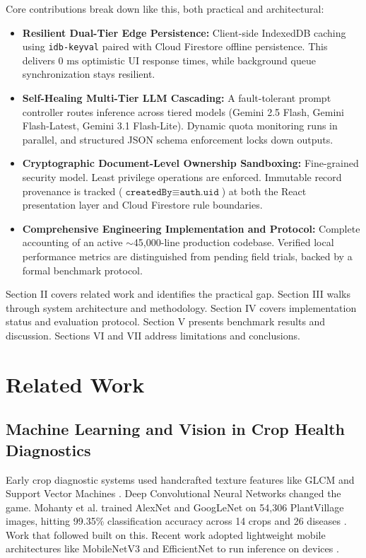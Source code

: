 \documentclass[conference]{IEEEtran}
\begin{document}
Core contributions break down like this, both practical and architectural:
\begin{itemize}
    \item \textbf{Resilient Dual-Tier Edge Persistence:} Client-side IndexedDB caching using \texttt{idb-keyval} paired with Cloud Firestore offline persistence. This delivers $0\text{ ms}$ optimistic UI response times, while background queue synchronization stays resilient.
    \item \textbf{Self-Healing Multi-Tier LLM Cascading:} A fault-tolerant prompt controller routes inference across tiered models (Gemini 2.5 Flash, Gemini Flash-Latest, Gemini 3.1 Flash-Lite). Dynamic quota monitoring runs in parallel, and structured JSON schema enforcement locks down outputs.
    \item \textbf{Cryptographic Document-Level Ownership Sandboxing:} Fine-grained security model. Least privilege operations are enforced. Immutable record provenance is tracked ($\texttt{createdBy} \equiv \texttt{auth.uid}$) at both the React presentation layer and Cloud Firestore rule boundaries.
    \item \textbf{Comprehensive Engineering Implementation and Protocol:} Complete accounting of an active $\sim$45,000-line production codebase. Verified local performance metrics are distinguished from pending field trials, backed by a formal benchmark protocol.
\end{itemize}

Section II covers related work and identifies the practical gap. Section III walks through system architecture and methodology. Section IV covers implementation status and evaluation protocol. Section V presents benchmark results and discussion. Sections VI and VII address limitations and conclusions.

\section{Related Work}

\subsection{Machine Learning and Vision in Crop Health Diagnostics}
Early crop diagnostic systems used handcrafted texture features like GLCM and Support Vector Machines \cite{camargo2009}. Deep Convolutional Neural Networks changed the game. Mohanty et al. trained AlexNet and GoogLeNet on 54,306 PlantVillage images, hitting 99.35\% classification accuracy across 14 crops and 26 diseases \cite{mohanty2016}. Work that followed built on this. Recent work adopted lightweight mobile architectures like MobileNetV3 and EfficientNet to run inference on devices \cite{howard2019}. 
\end{document}
